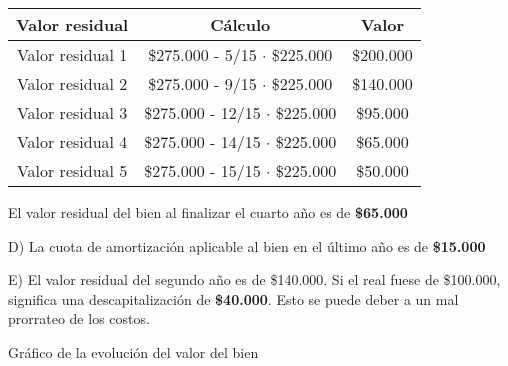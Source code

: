 \documentclass[12pt,a4paper]{article}
\begin{document}
        \begin{table}[H]
        \centering
        	\begin{tabular}{ | c | c | c | }
            	\hline
                Valor residual		&	Cálculo								&	Valor			\\ \hline
                Valor residual 1	&	\$275.000 - 5/15 $\cdot$ \$225.000	&	\$200.000		\\ \hline
                Valor residual 2	&	\$275.000 - 9/15 $\cdot$ \$225.000	&	\$140.000		\\ \hline
                Valor residual 3	&	\$275.000 - 12/15 $\cdot$ \$225.000	&	\$95.000		\\ \hline
                Valor residual 4	&	\$275.000 - 14/15 $\cdot$ \$225.000	&	\$65.000		\\ \hline
                Valor residual 5	&	\$275.000 - 15/15 $\cdot$ \$225.000	&	\$50.000		\\ \hline
			\end{tabular}
		\end{table}
        
        \par{
        	El valor residual del bien al finalizar el cuarto año es de \textbf{\$65.000}
            }
		
        \hrulefill
        
        D) La cuota de amortización aplicable al bien en el último año es de \textbf{\$15.000}
        
        \hrulefill
        
        E) El valor residual del segundo año es de \$140.000. Si el real fuese de \$100.000, significa una descapitalización de \textbf{\$40.000}. Esto se puede deber a un mal prorrateo de los costos.
        
        \hrulefill
        
        \par{
        	Gráfico de la evolución del valor del bien
            }
		
\end{document}
